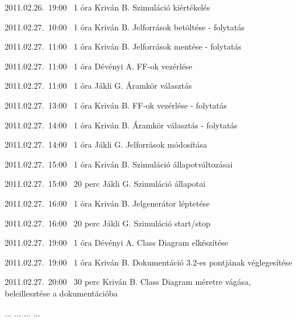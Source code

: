 \begin{naplo}
\bejegyzes
{2011.02.26.~19:00~} %
{1 óra} %
{Kriván B.} %
{Szimuláció kiértékelés} %

\bejegyzes
{2011.02.27.~10:00~} %
{1 óra} %
{Kriván B.} %
{Jelforrások betöltése - folytatás} %

\bejegyzes
{2011.02.27.~11:00~} %
{1 óra} %
{Kriván B.} %
{Jelforrások mentése - folytatás} %

\bejegyzes
{2011.02.27.~11:00~} %
{1 óra} %
{Dévényi A.} %
{FF-ok vezérlése} %

\bejegyzes
{2011.02.27.~11:00~} %
{1 óra} %
{Jákli G.} %
{Áramkör választás} %

\bejegyzes
{2011.02.27.~13:00~} %
{1 óra} %
{Kriván B.} %
{FF-ok vezérlése - folytatás} %

\bejegyzes
{2011.02.27.~14:00~} %
{1 óra} %
{Kriván B.} %
{Áramkör választás - folytatás} %

\bejegyzes
{2011.02.27.~14:00~} %
{1 óra} %
{Jákli G.} %
{Jelforrások módosítása} %

\bejegyzes
{2011.02.27.~15:00~} %
{1 óra} %
{Kriván B.} %
{Szimuláció állapotváltozásai} %

\bejegyzes
{2011.02.27.~15:00~} %
{20 perc} %
{Jákli G.} %
{Szimuláció állapotai} %

\bejegyzes
{2011.02.27.~16:00~} %
{1 óra} %
{Kriván B.} %
{Jelgenerátor léptetése} %

\bejegyzes
{2011.02.27.~16:00~} %
{20 perc} %
{Jákli G.} %
{Szimuláció start/stop} %

\bejegyzes
{2011.02.27.~19:00~} %
{1 óra} %
{Dévényi A.} %
{Class Diagram elkészítése} %

\bejegyzes
{2011.02.27.~19:00~} %
{1 óra} %
{Kriván B.} %
{Dokumentáció 3.2-es pontjának véglegesítése} %

\bejegyzes
{2011.02.27.~20:00~} %
{30 perc} %
{Kriván B.} %
{Class Diagram méretre vágása, beleillesztése a dokumentációba} %


\bejegyzes
{...}
{...}
{...}
{...}


\end{naplo}

